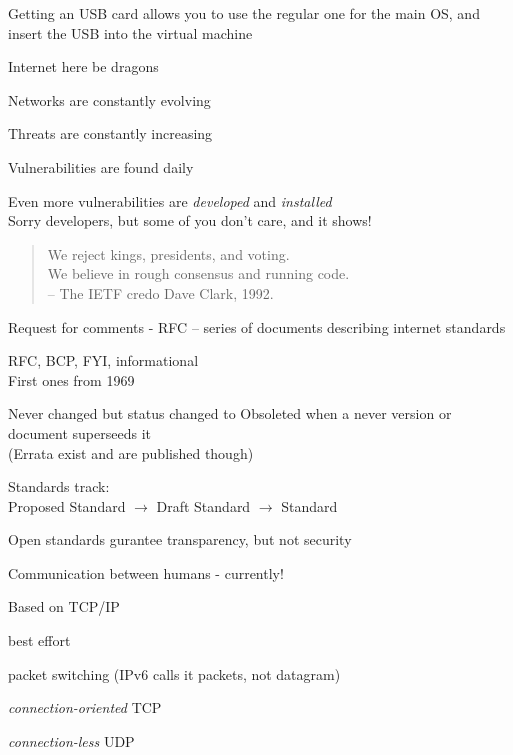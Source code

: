 \documentclass[Screen16to9,17pt]{foils}
\begin{document}
Getting an USB card allows you to use the regular one for the main OS, and insert the USB into the virtual machine



\centerline{\Large Internet here be dragons}

\begin{list2}
\item Networks are constantly evolving
\item Threats are constantly increasing
\item Vulnerabilities are found daily
\item Even more vulnerabilities are \emph{developed} and \emph{installed}\\
Sorry developers, but some of you don't care, and it shows!
\end{list2}



\begin{quote}
We reject kings, presidents, and voting.\\
We believe in rough consensus and running code.\\
-- The IETF credo Dave Clark, 1992.
\end{quote}

\begin{list2}
\item Request for comments - RFC -- series of documents describing internet standards
\item RFC, BCP, FYI, informational\\
First ones from 1969
\item Never changed but status changed to Obsoleted when a never version or document superseeds it\\
(Errata exist and are published though)
\item Standards track:\\
Proposed Standard $\rightarrow$ Draft Standard $\rightarrow$ Standard
\item  Open standards gurantee transparency, but not security
\end{list2}



\begin{list1}
\item Communication between humans - currently!
\item Based on TCP/IP
\begin{list2}
\item best effort
\item packet switching (IPv6 calls it packets, not datagram)
\item \emph{connection-oriented} TCP
\item \emph{connection-less} UDP
\end{list2}
\end{list1}
\end{document}
